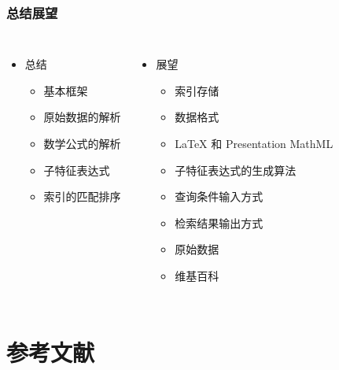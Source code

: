     \begin{frame}
        \frametitle{总结展望}
        \vspace{-3cm}
        \begin{columns}
                \begin{itemize}
                    \item 总结
                    \begin{itemize}
                        \item 基本框架
                        \item 原始数据的解析
                        \item 数学公式的解析
                        \item[] 子特征表达式
                        \item 索引的匹配排序
                    \end{itemize}
                \end{itemize}

            \pause

                \begin{itemize}
                    \item 展望
                    \begin{itemize}
                        \item 索引存储
                        \item 数据格式
                        \item[] LaTeX 和 Presentation MathML
                        \item 子特征表达式的生成算法
                        \item 查询条件输入方式
                        \item 检索结果输出方式
                        \item 原始数据
                        \item[] 维基百科
                    \end{itemize}
                \end{itemize}
        \end{columns}
    \end{frame}
    
    \section{参考文献}
    
